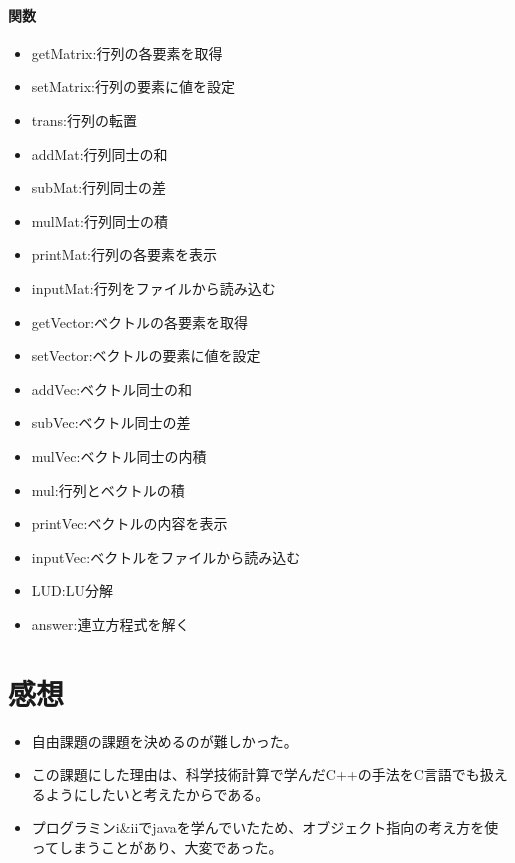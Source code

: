 \documentclass[12pt,a4j]{jarticle}
\begin{document}
\paragraph{関数}
\begin{itemize}
\item getMatrix:行列の各要素を取得
\item setMatrix:行列の要素に値を設定
\item trans:行列の転置
\item addMat:行列同士の和
\item subMat:行列同士の差
\item mulMat:行列同士の積
\item printMat:行列の各要素を表示
\item inputMat:行列をファイルから読み込む
\item getVector:ベクトルの各要素を取得
\item setVector:ベクトルの要素に値を設定
\item addVec:ベクトル同士の和
\item subVec:ベクトル同士の差
\item mulVec:ベクトル同士の内積
\item mul:行列とベクトルの積
\item printVec:ベクトルの内容を表示
\item inputVec:ベクトルをファイルから読み込む
\item LUD:LU分解
\item answer:連立方程式を解く
\end{itemize}

\section{感想}
\begin{itemize}
\item 自由課題の課題を決めるのが難しかった。
\item この課題にした理由は、科学技術計算で学んだC++の手法をC言語でも扱えるようにしたいと考えたからである。
\item プログラミンi\&iiでjavaを学んでいたため、オブジェクト指向の考え方を使ってしまうことがあり、大変であった。
\end{itemize}
  
\end{document}
